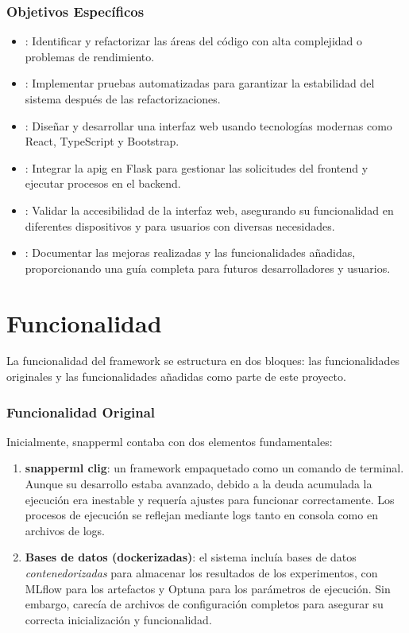 \subsubsection{Objetivos Específicos}
\begin{itemize}
    \item \textbf{}: Identificar y refactorizar las áreas del código con alta complejidad o problemas de rendimiento.
    \item \textbf{}: Implementar pruebas automatizadas para garantizar la estabilidad del sistema después de las refactorizaciones.
    \item \textbf{}: Diseñar y desarrollar una interfaz web usando tecnologías modernas como React, TypeScript y Bootstrap.
    \item \textbf{}: Integrar la \Gls{apig} en Flask para gestionar las solicitudes del \gls{frontend} y ejecutar procesos en el \gls{backend}.
    \item \textbf{}: Validar la accesibilidad de la interfaz web, asegurando su funcionalidad en diferentes dispositivos y para usuarios con diversas necesidades.
    \item \textbf{}: Documentar las mejoras realizadas y las funcionalidades añadidas, proporcionando una guía completa para futuros desarrolladores y usuarios.
\end{itemize}

\section{Funcionalidad}

La funcionalidad del \gls{framework} se estructura en dos bloques: las funcionalidades originales y las funcionalidades añadidas como parte de este proyecto.

\subsubsection{Funcionalidad Original}

Inicialmente, \Gls{snapperml} contaba con dos elementos fundamentales:

\begin{enumerate}
    \item \textbf{\Gls{snapperml} \Gls{clig}}: un \gls{framework} empaquetado como un comando de terminal. Aunque su desarrollo estaba avanzado, debido a la \Gls{deuda} acumulada la ejecución era inestable y requería ajustes para funcionar correctamente. Los procesos de ejecución se reflejan mediante \glspl{log} tanto en consola como en archivos de \glspl{log}.
    \item \textbf{Bases de datos (dockerizadas)}: el sistema incluía bases de datos \textit{contenedorizadas} para almacenar los resultados de los experimentos, con MLflow para los artefactos y Optuna para los parámetros de ejecución. Sin embargo, carecía de archivos de configuración completos para asegurar su correcta inicialización y funcionalidad. \end{enumerate}

